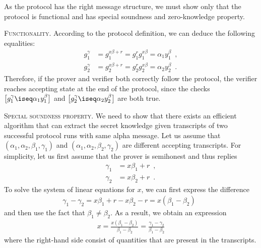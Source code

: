 \documentclass{crypto-exercise}
\begin{document}
\begin{solution}

As the protocol has the right message structure, we must show only that the protocol is functional and has special soundness and zero-knowledge property. 

\vspace*{2ex}
\noindent
\textsc{Functionality.} 
According to the protocol definition, we can deduce the following equalities: 
\begin{align*}
g_1^\gamma &= g_1^{x\beta + r} = g_1^r g_1^{x\beta} = \alpha_1 y_1^\beta\enspace, \\
g_2^\gamma &= g_2^{x\beta + r} = g_2^r g_2^{x\beta} = \alpha_2 y_2^\beta \enspace.
\end{align*}
Therefore, if the prover and verifier both correctly follow the protocol, the verifier reaches accepting state at the end of the protocol, since the checks $\bigl[g_1^{\gamma}\iseq \alpha_1 y_1^\beta\bigr]$ and $\bigl[g_2^{\gamma}\iseq \alpha_2 y_2^\beta\bigr]$ are both true.


\vspace*{2ex}
\noindent
\textsc{Special soundness property.} 
We need to show that there exists an efficient algorithm that can extract the secret knowledge given transcripts of two successful protocol runs with same alpha message. Let us assume that $(\alpha_1, \alpha_2, \beta_1, \gamma_1)$ and $(\alpha_1, \alpha_2, \beta_2, \gamma_2)$ are different accepting transcripts. For simplicity, let us first assume that the prover is semihonest and thus replies 
\begin{align*}
\gamma_1&=x\beta_1+r\enspace,\\
\gamma_2&=x\beta_2+r\enspace.
\end{align*}
To solve the system of linear equations for $x$, we can first express the difference
\begin{align*}
\gamma_1 - \gamma_2 = x\beta_1 + r - x\beta_2 - r = x(\beta_1 - \beta_2)\enspace
\end{align*}
and then use the fact that $\beta_1 \neq \beta_2$. As a result, we obtain an expression 
\begin{align*}
x =\frac{ x(\beta_1 - \beta_2)}{\beta_1 - \beta_2} = \frac{\gamma_1 - \gamma_2}{\beta_1 - \beta_2} 
\end{align*}
where the right-hand side consist of quantities that are present in the transcripts. 


\end{solution}
\end{document}
